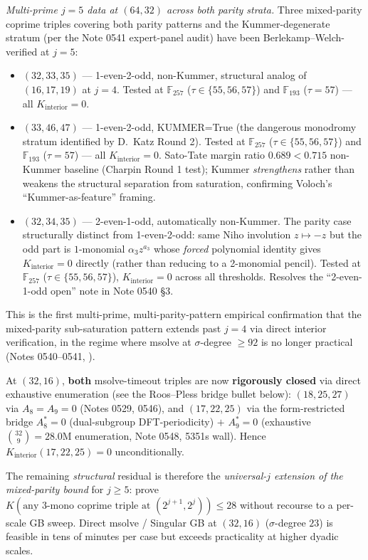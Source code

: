 \documentclass[11pt]{article}
\theoremstyle{definition}
\theoremstyle{remark}
\newcommand{\FF}{\mathbb{F}}
\begin{document}
\emph{Multi-prime $j = 5$ data at $(64, 32)$ across both parity
strata.} Three mixed-parity coprime triples covering both parity
patterns and the Kummer-degenerate stratum (per the Note 0541
expert-panel audit) have been Berlekamp--Welch-verified at $j = 5$:
\begin{itemize}\itemsep0pt
\item $(32, 33, 35)$ — 1-even-2-odd, non-Kummer, structural analog
of $(16, 17, 19)$ at $j=4$. Tested at $\FF_{257}$ ($\tau \in
\{55, 56, 57\}$) and $\FF_{193}$ ($\tau = 57$) — all $K_\mathrm{interior} = 0$.
\item $(33, 46, 47)$ — 1-even-2-odd, KUMMER=True (the dangerous
monodromy stratum identified by D.~Katz Round 2). Tested at
$\FF_{257}$ ($\tau \in \{55, 56, 57\}$) and $\FF_{193}$ ($\tau = 57$)
— all $K_\mathrm{interior} = 0$. Sato-Tate margin ratio
$0.689 < 0.715$ non-Kummer baseline (Charpin Round 1 test); Kummer
\emph{strengthens} rather than weakens the structural separation
from saturation, confirming Voloch's ``Kummer-as-feature'' framing.
\item $(32, 34, 35)$ — 2-even-1-odd, automatically non-Kummer. The
parity case structurally distinct from 1-even-2-odd: same Niho
involution $z \mapsto -z$ but the odd part is $1$-monomial $\alpha_3 z^{a_3}$
whose \emph{forced} polynomial identity gives $K_\mathrm{interior} = 0$
directly (rather than reducing to a 2-monomial pencil). Tested at
$\FF_{257}$ ($\tau \in \{55, 56, 57\}$), $K_\mathrm{interior} = 0$
across all thresholds. Resolves the ``2-even-1-odd open'' note in
Note 0540 §3.
\end{itemize}
This is the first multi-prime, multi-parity-pattern empirical
confirmation that the mixed-parity sub-saturation pattern extends
past $j = 4$ via direct interior verification, in the regime where
msolve at $\sigma$-degree $\geq 92$ is no longer practical
(Notes 0540--0541, \cite{CompanionRepo}).

At $(32, 16)$, \textbf{both} msolve-timeout triples are now
\textbf{rigorously closed} via direct exhaustive enumeration
(see the Roos--Pless bridge bullet below):
$(18, 25, 27)$ via $A_8 = A_9 = 0$ (Notes 0529, 0546), and
$(17, 22, 25)$ via the form-restricted bridge $A_8^* = 0$
(dual-subgroup DFT-periodicity) $+$ $A_9^* = 0$ (exhaustive
$\binom{32}{9} = 28.0\text{M}$ enumeration, Note 0548, 5351s wall).
Hence $K_{\text{interior}}(17, 22, 25) = 0$ unconditionally.

The remaining \emph{structural} residual is therefore the
\emph{universal-$j$ extension of the mixed-parity bound} for $j \geq 5$:
prove $K(\text{any 3-mono coprime triple at } (2^{j+1}, 2^j)) \leq 28$
without recourse to a per-scale GB sweep. Direct msolve / Singular GB at
$(32, 16)$ ($\sigma$-degree $23$) is feasible in tens of minutes per
case but exceeds practicality at higher dyadic scales.
\end{document}
